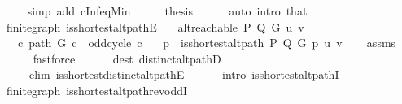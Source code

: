 \begin{isabellebody}
\ \ \ \ \isamarkupfalse%
\ {\isacharparenleft}{\kern0pt}simp\ add{\isacharcolon}{\kern0pt}\ cInf{\isacharunderscore}{\kern0pt}eq{\isacharunderscore}{\kern0pt}Min{\isacharparenright}{\kern0pt}\isanewline
\ \ \isamarkupfalse%
\ \isamarkupfalse%
\ {\isacharquery}{\kern0pt}thesis\isanewline
\ \ \ \ \isamarkupfalse%
\ {\isacharparenleft}{\kern0pt}auto\ intro{\isacharcolon}{\kern0pt}\ that{\isacharparenright}{\kern0pt}\isanewline
{}\isamarkupfalse%
%
\endisatagproof
{\isafoldproof}%
%
\isadelimproof
\isanewline
%
\endisadelimproof
\isanewline
{}\isamarkupfalse%
\ {\isacharparenleft}{\kern0pt}\ finite{\isacharunderscore}{\kern0pt}graph{\isacharparenright}{\kern0pt}\ is{\isacharunderscore}{\kern0pt}shortest{\isacharunderscore}{\kern0pt}alt{\isacharunderscore}{\kern0pt}pathE{\isacharcolon}{\kern0pt}\isanewline
\ \ \ {\isachardoublequoteopen}alt{\isacharunderscore}{\kern0pt}reachable\ P\ Q\ G\ u\ v{\isachardoublequoteclose}\isanewline
\ \ \ {\isachardoublequoteopen}{\isasymnot}\ {\isacharparenleft}{\kern0pt}{\isasymexists}c{\isachardot}{\kern0pt}\ path\ G\ c\ {\isasymand}\ odd{\isacharunderscore}{\kern0pt}cycle\ c{\isacharparenright}{\kern0pt}{\isachardoublequoteclose}\isanewline
\ \ \ p\ \ {\isachardoublequoteopen}is{\isacharunderscore}{\kern0pt}shortest{\isacharunderscore}{\kern0pt}alt{\isacharunderscore}{\kern0pt}path\ P\ Q\ G\ p\ u\ v{\isachardoublequoteclose}\isanewline
%
\isadelimproof
\ \ %
\endisadelimproof
%
\isatagproof
{}\isamarkupfalse%
\ assms\isanewline
\ \ \isamarkupfalse%
\isanewline
\ \ \ \ {\isacharparenleft}{\kern0pt}fastforce\isanewline
\ \ \ \ \ \ dest{\isacharcolon}{\kern0pt}\ distinct{\isacharunderscore}{\kern0pt}alt{\isacharunderscore}{\kern0pt}pathD{\isacharparenleft}{\kern0pt}{}{\isacharparenright}{\kern0pt}\isanewline
\ \ \ \ \ \ elim{\isacharcolon}{\kern0pt}\ is{\isacharunderscore}{\kern0pt}shortest{\isacharunderscore}{\kern0pt}distinct{\isacharunderscore}{\kern0pt}alt{\isacharunderscore}{\kern0pt}pathE\isanewline
\ \ \ \ \ \ intro{\isacharcolon}{\kern0pt}\ is{\isacharunderscore}{\kern0pt}shortest{\isacharunderscore}{\kern0pt}alt{\isacharunderscore}{\kern0pt}pathI{\isacharparenright}{\kern0pt}%
\endisatagproof
{\isafoldproof}%
%
\isadelimproof
\isanewline
%
\endisadelimproof
%
\isadeliminvisible
\isanewline
%
\endisadeliminvisible
%
\isataginvisible
{}\isamarkupfalse%
\ {\isacharparenleft}{\kern0pt}\ finite{\isacharunderscore}{\kern0pt}graph{\isacharparenright}{\kern0pt}\ is{\isacharunderscore}{\kern0pt}shortest{\isacharunderscore}{\kern0pt}alt{\isacharunderscore}{\kern0pt}path{\isacharunderscore}{\kern0pt}rev{\isacharunderscore}{\kern0pt}oddI{\isacharcolon}{\kern0pt}\isanewline

\end{isabellebody}
